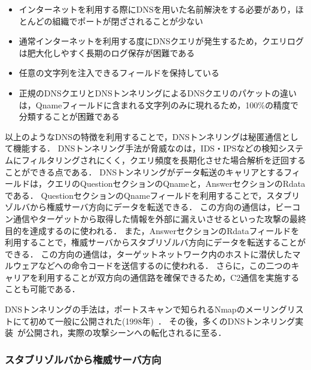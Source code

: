 \begin{itemize}
 \setlength{\itemsep}{0pt}
 \item インターネットを利用する際にDNSを用いた名前解決をする必要があり，ほとんどの組織でポートが閉ざされることが少ない
 \item 通常インターネットを利用する度にDNSクエリが発生するため，クエリログは肥大化しやすく長期のログ保存が困難である
 \item 任意の文字列を注入できるフィールドを保持している
 \item 正規のDNSクエリとDNSトンネリングによるDNSクエリのパケットの違いは，Qnameフィールドに含まれる文字列のみに現れるため，100\%の精度で分類することが困難である
\end{itemize}

以上のようなDNSの特徴を利用することで，DNSトンネリングは秘匿通信として機能する．
DNSトンネリング手法が脅威なのは，IDS・IPSなどの検知システムにフィルタリングされにくく，クエリ頻度を長期化させた場合解析を迂回することができる点である．
DNSトンネリングがデータ転送のキャリアとするフィールドは，クエリのQuestionセクションのQnameと，AnswerセクションのRdataである．
QuestionセクションのQnameフィールドを利用することで，スタブリゾルバから権威サーバ方向にデータを転送できる．
この方向の通信は，ビーコン通信やターゲットから取得した情報を外部に漏えいさせるといった攻撃の最終目的を達成するのに使われる．
また，AnswerセクションのRdataフィールドを利用することで，権威サーバからスタブリゾルバ方向にデータを転送することができる．
この方向の通信は，ターゲットネットワーク内のホストに潜伏したマルウェアなどへの命令コードを送信するのに使われる．
さらに，この二つのキャリアを利用することが双方向の通信路を確保できるため，C2通信を実施することも可能である．

DNSトンネリングの手法は，ポートスキャンで知られるNmapのメーリングリストにて初めて一般に公開された(1998年)~\cite{nmap}．
その後，多くのDNSトンネリング実装~\cite{ozymandns, iodine, dnscat2, tcp-over-dns, dnscat, denise, dns-shell, dnsbotnet, dnscapy, dohtunnel, godoh, dohc2, magictunnelandroid}が公開され，実際の攻撃シーンへの転化されるに至る．


\subsubsection{スタブリゾルバから権威サーバ方向}
\label{sec:dns-exfiltration}

